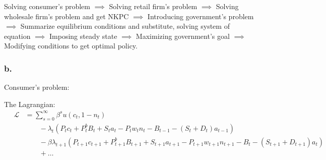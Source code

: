 \documentclass{article}
\begin{document}
Solving consumer's problem $\implies$ Solving retail firm's problem $\implies$ Solving wholesale firm's problem and get NKPC $\implies$ Introducing government's problem $\implies$ Summarize equilibrium conditions and substitute, solving system of equation $\implies$ Imposing steady state $\implies$ Maximizing government's goal $\implies$ Modifying conditions to get optimal policy.

\subsubsection*{b.}

Consumer's problem:


The Lagrangian:
\begin{align*}
    \quad\mathcal{L} & = \sum_{s=0}^{\infty}\beta^{s}u\left(c_{t},1-n_{t}\right)& \\
    &\quad\quad-\lambda_{t}\left(P_{t}c_{t}+P^{b}_{t}B_{t}+S_{t}a_{t}-P_{t}w_{t}n_{t}-B_{t-1}-\left(S_{t}+D_{t}\right)a_{t-1}\right)&\\
    &\quad\quad-\beta\lambda_{t+1}\left(P_{t+1}c_{t+1}+P^{b}_{t+1}B_{t+1}+S_{t+1}a_{t+1}-P_{t+1}w_{t+1}n_{t+1}-B_{t}-\left(S_{t+1}+D_{t+1}\right)a_{t}\right)&\\
    &\quad\quad+\dots
\end{align*}
\end{document}
